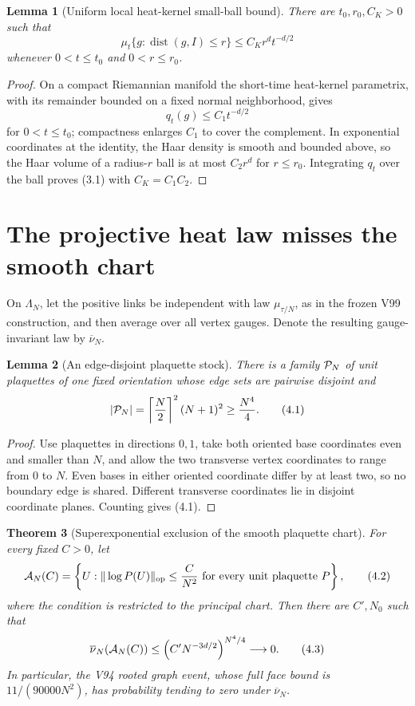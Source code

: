 \documentclass[11pt]{article}
\newtheorem{theorem}{Theorem}[section]
\newtheorem{lemma}[theorem]{Lemma}
\theoremstyle{remark}
\begin{document}
\begin{lemma}[Uniform local heat-kernel small-ball bound]
\label{lem:v19v1-small-ball}
There are \(t_0,r_0,C_K>0\) such that
\[
 \mu_t\{g:\operatorname{dist}(g,I)\le r\}
 \le C_K r^d t^{-d/2}                                    \tag{3.1}
\]
whenever \(0<t\le t_0\) and \(0<r\le r_0\).
\end{lemma}

\begin{proof}
On a compact Riemannian manifold the short-time heat-kernel parametrix,
with its remainder bounded on a fixed normal neighborhood, gives
\[
 q_t(g)\le C_1t^{-d/2}
\]
for \(0<t\le t_0\); compactness enlarges \(C_1\) to cover the complement.
In exponential coordinates at the identity, the Haar density is smooth
and bounded above, so the Haar volume of a radius-\(r\) ball is at most
\(C_2r^d\) for \(r\le r_0\).  Integrating \(q_t\) over the ball proves
(3.1) with \(C_K=C_1C_2\).
\end{proof}

\section{The projective heat law misses the smooth chart}
\label{sec:v19v1-mismatch}

On \(\Lambda_N\), let the positive links be independent with law
\(\mu_{\tau/N}\), as in the frozen V99 construction, and then average over
all vertex gauges.  Denote the resulting gauge-invariant law by
\(\overline\nu_N\).

\begin{lemma}[An edge-disjoint plaquette stock]
\label{lem:v19v1-disjoint}
There is a family \({\cal P}_N\) of unit plaquettes of one fixed orientation
whose edge sets are pairwise disjoint and
\[
 |{\cal P}_N|
 =\left\lceil\frac N2\right\rceil^2(N+1)^2
 \ge\frac{N^4}{4}.                                       \tag{4.1}
\]
\end{lemma}

\begin{proof}
Use plaquettes in directions \(0,1\), take both oriented base coordinates
even and smaller than \(N\), and allow the two transverse vertex
coordinates to range from \(0\) to \(N\).  Even bases in either oriented
coordinate differ by at least two, so no boundary edge is shared.
Different transverse coordinates lie in disjoint coordinate planes.
Counting gives (4.1).
\end{proof}

\begin{theorem}[Superexponential exclusion of the smooth plaquette chart]
\label{thm:v19v1-chart-exclusion}
For every fixed \(C>0\), let
\[
 {\cal A}_N(C)=
 \left\{U:\|\log P(U)\|_{\rm op}\le\frac{C}{N^2}
 \text{ for every unit plaquette }P\right\},              \tag{4.2}
\]
where the condition is restricted to the principal chart.  Then there are
\(C',N_0\) such that
\[
 \overline\nu_N({\cal A}_N(C))
 \le\left(C'N^{-3d/2}\right)^{N^4/4}
 \longrightarrow0.                                       \tag{4.3}
\]
In particular, the V94 rooted graph event, whose full face bound is
\(11/(90000N^2)\), has probability tending to zero under
\(\overline\nu_N\).
\end{theorem}
\end{document}
